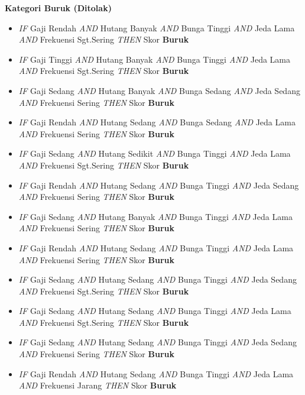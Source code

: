 \documentclass[12pt,a4paper]{report}
\begin{document}
\vspace{4pt}
\noindent\textbf{Kategori Buruk (Ditolak)}
\begin{itemize}
  \item[R11] \textit{IF} Gaji Rendah \textit{AND} Hutang Banyak \textit{AND} Bunga Tinggi \textit{AND} Jeda Lama \textit{AND} Frekuensi Sgt.Sering \textit{THEN} Skor \textbf{Buruk}
  \item[R12] \textit{IF} Gaji Tinggi \textit{AND} Hutang Banyak \textit{AND} Bunga Tinggi \textit{AND} Jeda Lama \textit{AND} Frekuensi Sgt.Sering \textit{THEN} Skor \textbf{Buruk}
  \item[R13] \textit{IF} Gaji Sedang \textit{AND} Hutang Banyak \textit{AND} Bunga Sedang \textit{AND} Jeda Sedang \textit{AND} Frekuensi Sering \textit{THEN} Skor \textbf{Buruk}
  \item[R14] \textit{IF} Gaji Rendah \textit{AND} Hutang Sedang \textit{AND} Bunga Sedang \textit{AND} Jeda Lama \textit{AND} Frekuensi Sering \textit{THEN} Skor \textbf{Buruk}
  \item[R15] \textit{IF} Gaji Sedang \textit{AND} Hutang Sedikit \textit{AND} Bunga Tinggi \textit{AND} Jeda Lama \textit{AND} Frekuensi Sgt.Sering \textit{THEN} Skor \textbf{Buruk}
  \item[R21] \textit{IF} Gaji Rendah \textit{AND} Hutang Sedang \textit{AND} Bunga Tinggi \textit{AND} Jeda Sedang \textit{AND} Frekuensi Sering \textit{THEN} Skor \textbf{Buruk}
  \item[R22] \textit{IF} Gaji Sedang \textit{AND} Hutang Banyak \textit{AND} Bunga Tinggi \textit{AND} Jeda Lama \textit{AND} Frekuensi Sering \textit{THEN} Skor \textbf{Buruk}
  \item[R25] \textit{IF} Gaji Rendah \textit{AND} Hutang Sedang \textit{AND} Bunga Tinggi \textit{AND} Jeda Lama \textit{AND} Frekuensi Sering \textit{THEN} Skor \textbf{Buruk}
  \item[R26] \textit{IF} Gaji Sedang \textit{AND} Hutang Sedang \textit{AND} Bunga Tinggi \textit{AND} Jeda Sedang \textit{AND} Frekuensi Sgt.Sering \textit{THEN} Skor \textbf{Buruk}
  \item[R27] \textit{IF} Gaji Sedang \textit{AND} Hutang Sedang \textit{AND} Bunga Tinggi \textit{AND} Jeda Lama \textit{AND} Frekuensi Sgt.Sering \textit{THEN} Skor \textbf{Buruk}
  \item[R28] \textit{IF} Gaji Sedang \textit{AND} Hutang Sedang \textit{AND} Bunga Tinggi \textit{AND} Jeda Sedang \textit{AND} Frekuensi Sering \textit{THEN} Skor \textbf{Buruk}
  \item[R29] \textit{IF} Gaji Rendah \textit{AND} Hutang Sedang \textit{AND} Bunga Tinggi \textit{AND} Jeda Lama \textit{AND} Frekuensi Jarang \textit{THEN} Skor \textbf{Buruk}

\end{itemize}
\end{document}
